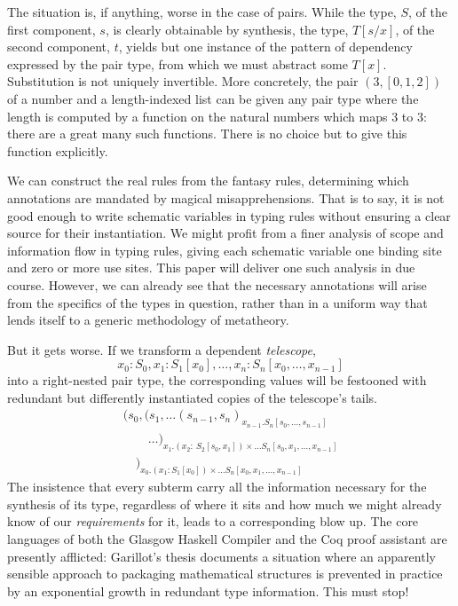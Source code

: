 \documentclass{jfp1}
\begin{document}
The situation is, if anything, worse in the case of pairs. While the
type, $S$, of the first component, $s$, is clearly obtainable by synthesis, the
type, $T[s/x]$, of the second component, $t$, yields but one instance of the
pattern of dependency expressed by the pair type, from which we must
abstract some $T[x]$. Substitution is not uniquely invertible. More
concretely, the pair $(3, [0,1,2])$ of a number and a length-indexed list
can be given any pair type where the length is computed by a function on
the natural numbers which maps $3$ to $3$: there are a great many such
functions. There is no choice but to give this function explicitly.

We can construct the real rules from the fantasy rules, determining
which annotations are mandated by magical misapprehensions. That is to
say, it is not good enough to write schematic variables in typing rules
without ensuring a clear source for their instantiation. We might profit
from a finer analysis of scope and information flow in typing rules, giving
each schematic variable one binding site and zero or more use sites.
This paper will deliver one such analysis in due course. However, we can
already see that the necessary annotations will arise from the specifics
of the types in question, rather than in a uniform way that lends itself
to a generic methodology of metatheory.

But it gets worse. If we transform a dependent \emph{telescope},
\[x_0\!:\!S_0,x_1\!:\!S_1[x_0],\ldots,x_n\!:\!S_n[x_0,\ldots,x_{n-1}]\]
into a right-nested pair type, the corresponding values will be
festooned with redundant but differently instantiated copies of the
telescope's tails.
\[\begin{array}{l}
    (s_0,(s_1,\ldots (s_{n-1},s_n)_{x_{n-1}.S_n[s_0,\ldots,s_{n-1}]}\\
    \qquad
    \ldots)_{x_1.(x_2\!:\:S_2[s_0,x_1])\times\ldots S_n[s_0,x_1,\ldots,x_{n-1}]}\\
    \quad)_{x_0.(x_1\!:\!S_1[x_0])\times\ldots S_n[x_0,x_1,\ldots,x_{n-1}]}
\end{array}\]
The insistence that every subterm carry all the information necessary
for the synthesis of its type, regardless of where it sits and how much
we might already know of our \emph{requirements} for it, leads to a
corresponding blow up. The core languages of both the Glasgow Haskell
Compiler and the Coq proof assistant are presently afflicted: Garillot's
thesis documents a situation where an apparently sensible approach to
packaging mathematical structures is prevented in practice by an
exponential growth in redundant type information. This must stop!
\end{document}
